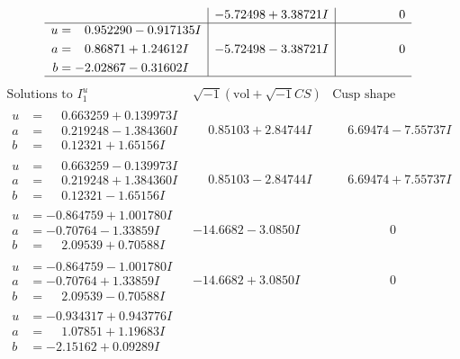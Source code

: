\documentclass[1p]{elsarticle_modified}
\theoremstyle{definition}
\newcommand{\I}{\sqrt{-1}}
\begin{document}
$$\begin{array}{c|c|c}
 & -5.72498 + 3.38721 I & \phantom{-0.000000 } 0 \\ \hline\begin{aligned}
u &= \phantom{-}0.952290 - 0.917135 I \\
a &= \phantom{-}0.86871 + 1.24612 I \\
b &= -2.02867 - 0.31602 I\end{aligned}
 & -5.72498 - 3.38721 I & \phantom{-0.000000 } 0\\
 \hline 
 \end{array}$$\newpage$$\begin{array}{c|c|c}  
\text{Solutions to }I^u_{1}& \I (\text{vol} + \sqrt{-1}CS) & \text{Cusp shape}\\
 \hline 
\begin{aligned}
u &= \phantom{-}0.663259 + 0.139973 I \\
a &= \phantom{-}0.219248 - 1.384360 I \\
b &= \phantom{-}0.12321 + 1.65156 I\end{aligned}
 & \phantom{-}0.85103 + 2.84744 I & \phantom{-}6.69474 - 7.55737 I \\ \hline\begin{aligned}
u &= \phantom{-}0.663259 - 0.139973 I \\
a &= \phantom{-}0.219248 + 1.384360 I \\
b &= \phantom{-}0.12321 - 1.65156 I\end{aligned}
 & \phantom{-}0.85103 - 2.84744 I & \phantom{-}6.69474 + 7.55737 I \\ \hline\begin{aligned}
u &= -0.864759 + 1.001780 I \\
a &= -0.70764 - 1.33859 I \\
b &= \phantom{-}2.09539 + 0.70588 I\end{aligned}
 & -14.6682 - 3.0850 I & \phantom{-0.000000 } 0 \\ \hline\begin{aligned}
u &= -0.864759 - 1.001780 I \\
a &= -0.70764 + 1.33859 I \\
b &= \phantom{-}2.09539 - 0.70588 I\end{aligned}
 & -14.6682 + 3.0850 I & \phantom{-0.000000 } 0 \\ \hline\begin{aligned}
u &= -0.934317 + 0.943776 I \\
a &= \phantom{-}1.07851 + 1.19683 I \\
b &= -2.15162 + 0.09289 I\end{aligned}

\end{array}$$
\end{document}
